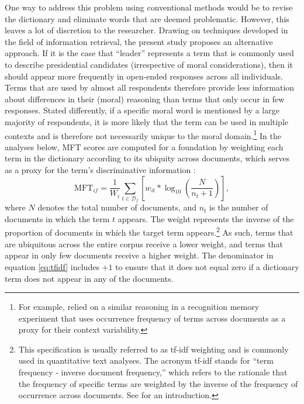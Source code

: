 \documentclass[12pt]{article}
\begin{document}
One way to address this problem using conventional methods would be to revise the dictionary and eliminate words that are deemed problematic. However, this leaves a lot of discretion to the researcher. Drawing on techniques developed in the field of information retrieval, the present study proposes an alternative approach. If it is the case that ``leader'' represents a term that is commonly used to describe presidential candidates (irrespective of moral considerations), then it should appear more frequently in open-ended responses across all individuals. Terms that are used by almost all respondents therefore provide less information about differences in their (moral) reasoning than terms that only occur in few responses.  Stated differently, if a specific moral word is mentioned by a large majority of respondents, it is more likely that the term can be used in multiple contexts and is therefore not necessarily unique to the moral domain.\footnote{For example, \citet{steyvers2003effect} relied on a similar reasoning in a recognition memory experiment that uses occurrence frequency of terms across documents as a proxy for their context variability.} In the analyses below, MFT scores are computed for a foundation by weighting each term in the dictionary according to its ubiquity across documents, which serves as a proxy for the term's discriminative information \citep[c.f. for example][]{manning2008introduction}:
\begin{equation}\label{eq:tfidf}
\text{MFT}_{if} = \dfrac{1}{W_i} \sum_{t \in \mathcal{D}_f} \left[ w_{it} * \log_{10}\left( \dfrac{N}{n_t+1}\right) \right],
\end{equation}
where $N$ denotes the total number of documents, and $n_t$ is the number of documents in which the term $t$ appears. The weight represents the inverse of the proportion of documents in which the target term appears.\footnote{This specification is usually referred to as tf-idf weighting and is commonly used in quantitative text analyses. The acronym tf-idf stands for ``term frequency - inverse document frequency,'' which refers to the rationale that the frequency of specific terms are weighted by the inverse of the frequency of occurrence across documents. See \citet[ch. 6]{manning2008introduction} for an introduction.} As such, terms that are ubiquitous across the entire corpus receive a lower weight, and terms that appear in only few documents receive a higher weight. The denominator in equation \eqref{eq:tfidf} includes $+1$ to ensure that it does not equal zero if a dictionary term does not appear in any of the documents.
\end{document}
